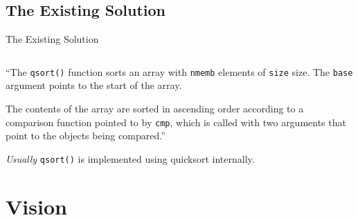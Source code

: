 \documentclass[13pt]{beamer}
\begin{document}
\subsection{The Existing Solution}
\begin{frame}[c]{The Existing Solution}
	\begin{center}
		\begin{minipage}{0.8\textwidth}
			\inputminted{c}{include.c}
		\end{minipage}

		\pause
		\vspace{0.3cm}
		\begin{displayquote}
			``The \texttt{qsort()} function sorts an array with \texttt{nmemb}
			elements of \texttt{size} size. The \texttt{base} argument points to the
			start of the array.

			The contents of the array are sorted in ascending order according to a
			comparison function pointed to by \texttt{cmp}, which is called with two
			arguments that point to the objects being compared.''
		\end{displayquote}

		\pause
		\textit{Usually} \texttt{qsort()} is implemented using quicksort internally.
	\end{center}
\end{frame}

\section{Vision}
\end{document}
